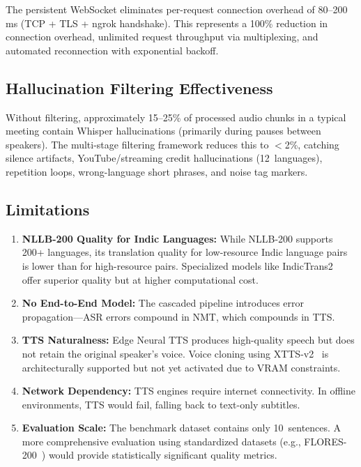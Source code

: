 \documentclass[conference]{IEEEtran}
\begin{document}
The persistent WebSocket eliminates per-request connection overhead of 80--200\,ms (TCP + TLS + ngrok handshake). This represents a 100\% reduction in connection overhead, unlimited request throughput via multiplexing, and automated reconnection with exponential backoff.

\subsection{Hallucination Filtering Effectiveness}

Without filtering, approximately 15--25\% of processed audio chunks in a typical meeting contain Whisper hallucinations (primarily during pauses between speakers). The multi-stage filtering framework reduces this to $<$2\%, catching silence artifacts, YouTube/streaming credit hallucinations (12~languages), repetition loops, wrong-language short phrases, and noise tag markers.

\subsection{Limitations}

\begin{enumerate}
  \item \textbf{NLLB-200 Quality for Indic Languages:} While NLLB-200 supports 200+ languages, its translation quality for low-resource Indic language pairs is lower than for high-resource pairs. Specialized models like IndicTrans2~\cite{indictrans2} offer superior quality but at higher computational cost.

  \item \textbf{No End-to-End Model:} The cascaded pipeline introduces error propagation---ASR errors compound in NMT, which compounds in TTS.

  \item \textbf{TTS Naturalness:} Edge Neural TTS produces high-quality speech but does not retain the original speaker's voice. Voice cloning using XTTS-v2~\cite{xtts} is architecturally supported but not yet activated due to VRAM constraints.

  \item \textbf{Network Dependency:} TTS engines require internet connectivity. In offline environments, TTS would fail, falling back to text-only subtitles.

  \item \textbf{Evaluation Scale:} The benchmark dataset contains only 10~sentences. A more comprehensive evaluation using standardized datasets (e.g., FLORES-200~\cite{nllb}) would provide statistically significant quality metrics.
\end{enumerate}
\end{document}
